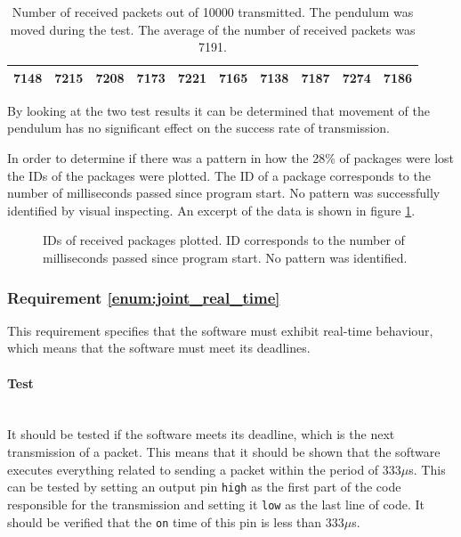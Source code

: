 {\begin{table}[h]
\centering
\begin{tabular}{|l|l|l|l|l|l|l|l|l|l|}
\hline
7148 & 7215 & 7208 & 7173 & 7221 & 7165 & 7138 & 7187 & 7274 & 7186 \\ \hline
\end{tabular}
\caption[Number of received packets with movement.]{Number of received packets out of 10000 transmitted. The pendulum was moved during the test. The average of the number of received packets was 7191.}
\label{tab:received_moved}
\end{table}
By looking at the two test results it can be determined that movement of the pendulum has no significant effect on the success rate of transmission.

In order to determine if there was a pattern in how the 28\% of packages were lost the IDs of the packages were plotted.
The ID of a package corresponds to the number of milliseconds passed since program start.
No pattern was successfully identified by visual inspecting.
An excerpt of the data is shown in figure \ref{fig:received_packets}.

\begin{figure}[h]
	\centering
	\caption[IDs of received packages plotted.]{IDs of received packages plotted. ID corresponds to the number of milliseconds passed since program start. No pattern was identified.}
	\label{fig:received_packets}
\end{figure}

\subsubsection{Requirement \ref{enum:joint_real_time}} %
\label{ssub:requirement_enum_joint_real_time}
This requirement specifies that the software must exhibit real-time behaviour, which means that the software must meet its deadlines.

\paragraph{Test}~\\
It should be tested if the software meets its deadline, which is the next transmission of a packet.
This means that it should be shown that the software executes everything related to sending a packet within the period of 333$\mu$s.
This can be tested by setting an output pin \texttt{high} as the first part of the code responsible for the transmission and setting it \texttt{low} as the last line of code.
It should be verified that the \texttt{on} time of this pin is less than 333$\mu$s.

}
